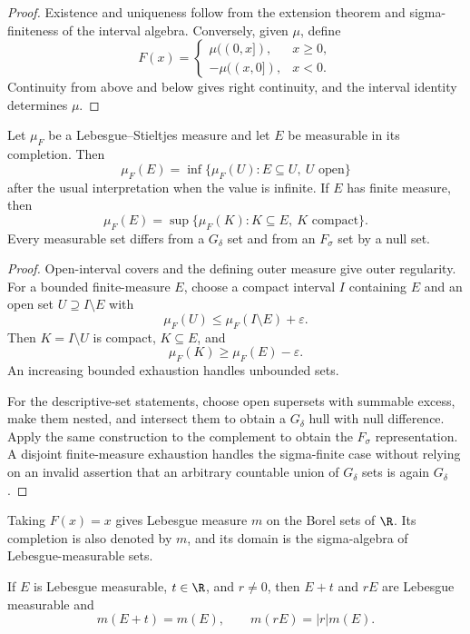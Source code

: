 \begin{proof}
Existence and uniqueness follow from the extension theorem and sigma-finiteness of the interval algebra. Conversely, given $\mu$, define
\[
F(x)=\begin{cases}
\mu((0,x]),&x\geq0,\\
-\mu((x,0]),&x<0.
\end{cases}
\]
Continuity from above and below gives right continuity, and the interval identity determines $\mu$.
\end{proof}

\begin{thm}[Regularity on $\R$]
Let $\mu_F$ be a Lebesgue--Stieltjes measure and let $E$ be measurable in its completion. Then
\[
\mu_F(E)=\inf\{\mu_F(U):E\subseteq U,\ U\text{ open}\}
\]
after the usual interpretation when the value is infinite. If $E$ has finite measure, then
\[
\mu_F(E)=\sup\{\mu_F(K):K\subseteq E,\ K\text{ compact}\}.
\]
Every measurable set differs from a $G_\delta$ set and from an $F_\sigma$ set by a null set.
\end{thm}

\begin{proof}
Open-interval covers and the defining outer measure give outer regularity. For a bounded finite-measure $E$, choose a compact interval $I$ containing $E$ and an open set $U\supseteq I\setminus E$ with
\[
\mu_F(U)\leq\mu_F(I\setminus E)+\varepsilon.
\]
Then $K=I\setminus U$ is compact, $K\subseteq E$, and
\[
\mu_F(K)\geq\mu_F(E)-\varepsilon.
\]
An increasing bounded exhaustion handles unbounded sets.

For the descriptive-set statements, choose open supersets with summable excess, make them nested, and intersect them to obtain a $G_\delta$ hull with null difference. Apply the same construction to the complement to obtain the $F_\sigma$ representation. A disjoint finite-measure exhaustion handles the sigma-finite case without relying on an invalid assertion that an arbitrary countable union of $G_\delta$ sets is again $G_\delta$.
\end{proof}

\begin{de}
Taking $F(x)=x$ gives Lebesgue measure $m$ on the Borel sets of $\R$. Its completion is also denoted by $m$, and its domain is the sigma-algebra of Lebesgue-measurable sets.
\end{de}

\begin{thm}
If $E$ is Lebesgue measurable, $t\in\R$, and $r\neq0$, then $E+t$ and $rE$ are Lebesgue measurable and
\[
m(E+t)=m(E),
\qquad
m(rE)=|r|m(E).
\]
\end{thm}

